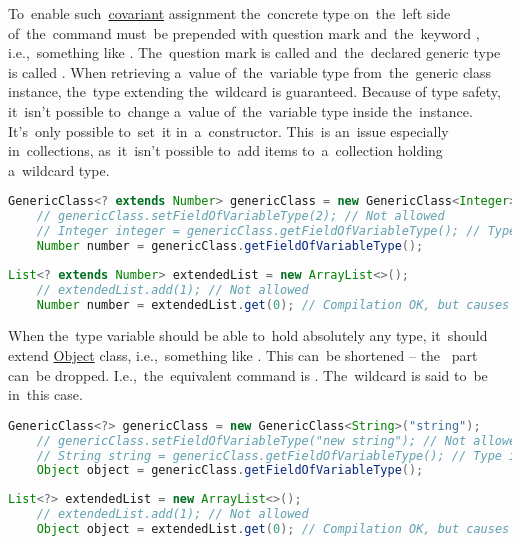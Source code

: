 To~enable such~\hyperref[covariance]{covariant} assignment the~concrete type on~the~left side of~the~command must~be prepended with question mark and~the~keyword , i.e.,~something like .
The~question mark is called  and~the~declared generic type is called .
When retrieving a~value of~the~variable type from~the~generic class instance, the~type extending the~wildcard is guaranteed.
Because of type safety, it~isn't possible to~change a~value of~the~variable type inside the~instance.
It's~only possible to~set~it in~a~constructor.
This~is an~issue especially in~collections, as~it~isn't possible to~add items to~a~collection holding a~wildcard type.

\begin{lstlisting}[language=Java, title={With the example class}]
    GenericClass<? extends Number> genericClass = new GenericClass<Integer>(1);
    // genericClass.setFieldOfVariableType(2); // Not allowed
    // Integer integer = genericClass.getFieldOfVariableType(); // Type is Number
    Number number = genericClass.getFieldOfVariableType();
\end{lstlisting}
\newpage

\begin{lstlisting}[language=Java, title={With a list}]
    List<? extends Number> extendedList = new ArrayList<>();
    // extendedList.add(1); // Not allowed
    Number number = extendedList.get(0); // Compilation OK, but causes NullPointerException in runtime
\end{lstlisting}

\noindent When the~type variable should be able to~hold absolutely any type, it~should extend \hyperref[javaobject]{Object} class, i.e.,~something like .
This can~be shortened -- the~ part can~be dropped.
I.e.,~the~equivalent command is .
The~wildcard is said to~be  in~this case.

\begin{lstlisting}[language=Java, title={With the example class}]
    GenericClass<?> genericClass = new GenericClass<String>("string");
    // genericClass.setFieldOfVariableType("new string"); // Not allowed
    // String string = genericClass.getFieldOfVariableType(); // Type is Object
    Object object = genericClass.getFieldOfVariableType();
\end{lstlisting}
\begin{lstlisting}[language=Java, title={With a list}]
    List<?> extendedList = new ArrayList<>();
    // extendedList.add(1); // Not allowed
    Object object = extendedList.get(0); // Compilation OK, but causes NullPointerException in runtime
\end{lstlisting}
\newline

